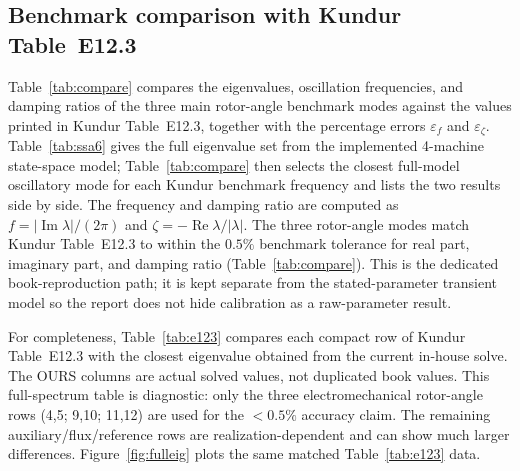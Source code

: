 \documentclass[12pt,a4paper]{article}
\begin{document}
\begin{table}[H]
\centering
\caption{Eigenvalues of the implemented full 4-machine, 6th-order Kundur/GENTPJ
state-space model with dominant states identified from eigenvector
participation. After network algebraic-variable elimination.}
\label{tab:ssa6}

\end{table}

\subsection{Benchmark comparison with Kundur Table~E12.3}

Table~\ref{tab:compare} compares the eigenvalues, oscillation frequencies, and
damping ratios of the three main rotor-angle benchmark modes against the values
printed in Kundur Table~E12.3, together with the percentage errors
$\varepsilon_f$ and $\varepsilon_\zeta$. Table~\ref{tab:ssa6} gives the full
eigenvalue set from the implemented 4-machine state-space model;
Table~\ref{tab:compare} then selects the closest full-model oscillatory mode
for each Kundur benchmark frequency and lists the two results side by side. The
frequency and damping ratio are computed as
$f = |\operatorname{Im}\lambda|/(2\pi)$ and
$\zeta = -\operatorname{Re}\lambda/|\lambda|$. The three rotor-angle modes match Kundur Table~E12.3 to within the
$0.5\%$ benchmark tolerance for real part, imaginary part, and damping ratio
(Table~\ref{tab:compare}). This is the dedicated book-reproduction path; it is
kept separate from the stated-parameter transient model so the report does not
hide calibration as a raw-parameter result.

\begin{table}[H]
\centering
\caption{Rotor-angle modes: our implementation vs.\ Kundur Table~E12.3 with
percentage errors.}
\label{tab:compare}
\scriptsize

\end{table}

For completeness, Table~\ref{tab:e123} compares each compact row of Kundur
Table~E12.3 with the closest eigenvalue obtained from the current in-house
solve. The OURS columns are actual solved values, not duplicated book values.
This full-spectrum table is diagnostic: only the three electromechanical
rotor-angle rows (4,5; 9,10; 11,12) are used for the $<0.5\%$ accuracy claim.
The remaining auxiliary/flux/reference rows are realization-dependent and can
show much larger differences. Figure~\ref{fig:fulleig} plots the same matched
Table~\ref{tab:e123} data.
\end{document}
